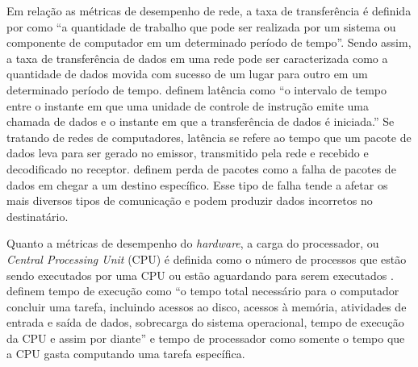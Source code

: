 Em relação as métricas de desempenho de rede, a taxa de transferência é definida por \cite[p.~77, tradução nossa]{IEEE.Standard.Glossary} como ``a quantidade de trabalho que pode ser realizada por um sistema ou componente de computador em um determinado período de tempo''. Sendo assim, a taxa de transferência de dados em uma rede pode ser caracterizada como a quantidade de dados movida com sucesso de um lugar para outro em um determinado período de tempo.
\cite[p.~43, tradução nossa]{IEEE.Standard.Glossary} definem latência como ``o intervalo de tempo entre o instante em que uma unidade de controle de instrução emite uma chamada de dados e o instante em que a transferência de dados é iniciada.'' Se tratando de redes de computadores, latência se refere ao tempo que um pacote de dados leva para ser gerado no emissor, transmitido pela rede e recebido e decodificado no receptor.
\cite{Bhadra2015} definem perda de pacotes como a falha de pacotes de dados em chegar a um destino específico. Esse tipo de falha tende a afetar os mais diversos tipos de comunicação e podem produzir dados incorretos no destinatário.

Quanto a métricas de desempenho do \textit{hardware}, a carga do processador, ou \textit{Central Processing Unit} (CPU) é definida como o número de processos que estão sendo executados por uma CPU ou estão aguardando para serem executados \cite{Sebastian2014}.
\cite[p.~242, tradução nossa]{Patterson2014-qv} definem tempo de execução como ``o tempo total necessário para o computador concluir uma tarefa, incluindo acessos ao disco, acessos à memória, atividades de entrada e saída de dados, sobrecarga do sistema operacional, tempo de execução da CPU e assim por diante'' e tempo de processador como somente o tempo que a CPU gasta computando uma tarefa específica.
